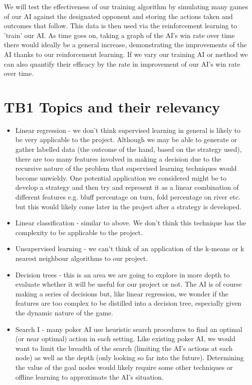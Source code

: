 \documentclass{article}
\begin{document}
\begin{multicols*}{2}
We will test the effectiveness of our training algorithm by simulating many games of our AI against the designated opponent and storing the actions taken and outcomes that follow. This data is then used via the reinforcement learning to 'train' our AI. As time goes on, taking a graph of the AI's win rate over time there would ideally be a general increase, demonstrating the improvements of the AI thanks to our reinforcement learning. If we vary our training AI or method we can also quantify their efficacy by the rate in improvement of our AI's win rate over time.





\section{TB1 Topics and their relevancy}
\begin{itemize}
    \item Linear regression - we don't think supervised learning in general is likely to be very applicable to the project. Although we may be able to generate or gather labelled data (the outcome of the hand, based on the strategy used), there are too many features involved in making a decision due to the recursive nature of the problem that supervised learning techniques would become unwieldy. One potential application we considered might be to develop a strategy and then try and represent it as a linear combination of different features e.g. bluff percentage on turn, fold percentage on river etc. but this would likely come later in the project after a strategy is developed.
    \item Linear classification - similar to above. We don't think this technique has the complexity to be applicable to the project.
    \item Unsupervised learning - we can't think of an application of the k-means or k nearest neighbour algorithms to our project.
    \item Decision trees - this is an area we are going to explore in more depth to evaluate whether it will be useful for our project or not. The AI is of course making a series of decisions but, like linear regression, we wonder if the features are too complex to be distilled into a decision tree, especially given the dynamic nature of the game.
    \item Search I - many poker AI use heuristic search procedures to find an optimal (or near optimal) action in each setting. Like existing poker AI, we would want to limit the breadth of the search (limiting the AI's actions at each node) as well as the depth (only looking so far into the future). Determining the value of the goal nodes would likely require some other techniques or offline learning to approximate the AI's situation.

\end{itemize}
\end{multicols*}
\end{document}
